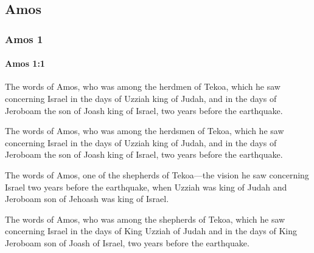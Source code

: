 \subsection{Amos}
	\label{AMOS}

	\subsubsection{Amos 1} %
		\label{AMOS-1}

		\paragraph{Amos 1:1} %
			\label{AMOS-1-1}

			The words of Amos, who was among the herdmen of Tekoa, which he saw concerning Israel in the days of Uzziah king of Judah, and in the days of Jeroboam the son of Joash king of Israel, two years before the earthquake.

			\begin{versebox}
					\item[BHS] 
					\item[LXX] 
					\item[ASV] The words of Amos, who was among the herdsmen of Tekoa, which he saw concerning Israel in the days of Uzziah king of Judah, and in the days of Jeroboam the son of Joash king of Israel, two years before the earthquake.
					\item[NIV] The words of Amos, one of the shepherds of Tekoa—the vision he saw concerning Israel two years before the earthquake, when Uzziah was king of Judah and Jeroboam son of Jehoash was king of Israel.
					\item[NRSV] The words of Amos, who was among the shepherds of Tekoa, which he saw concerning Israel in the days of King Uzziah of Judah and in the days of King Jeroboam son of Joash of Israel, two years before the earthquake.
			\end{versebox}

